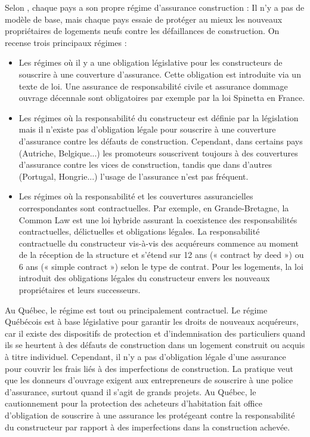 \documentclass[11pt]{article}
\begin{document}
Selon \cite{regime}, chaque pays a son propre régime d'assurance construction : Il n'y a pas de modèle de base, mais chaque pays essaie de protéger au mieux les nouveaux propriétaires de logements neufs contre les défaillances de construction. On recense trois principaux régimes :
\begin{itemize}
\item Les régimes où il y a une obligation législative pour les constructeurs de souscrire à une couverture d'assurance. Cette obligation est introduite via un texte de loi. Une assurance de responsabilité civile et assurance dommage ouvrage décennale sont obligatoires par exemple par la loi Spinetta en France.
\item Les régimes où la responsabilité du constructeur est définie par la législation mais il n'existe pas d'obligation légale pour souscrire à une couverture d'assurance contre les défauts de construction. Cependant, dans certains pays (Autriche, Belgique...) les promoteurs souscrivent toujours à des couvertures d'assurance contre les vices de construction, tandis que dans d'autres (Portugal, Hongrie...) l'usage de l'assurance n'est pas fréquent.
\item Les régimes où la responsabilité et les couvertures assurancielles correspondantes sont contractuelles. Par exemple, en Grande-Bretagne, la Common Law est une loi hybride assurant la coexistence des responsabilités contractuelles, délictuelles et obligations légales. La responsabilité contractuelle du constructeur vis-à-vis des acquéreurs commence au moment de la réception de la structure et s'étend sur 12 ans (« contract by deed ») ou 6 ans (« simple contract ») selon le type de contrat. Pour les logements, la loi introduit des obligations légales du constructeur envers les nouveaux propriétaires et leurs successeurs.
\end{itemize}

Au Québec, le régime est tout ou principalement contractuel. Le régime Québécois est à base législative pour garantir les droits de nouveaux acquéreurs, car il existe des dispositifs de protection et d'indemnisation des particuliers quand ils se heurtent à des défauts de construction dans un logement construit ou acquis à titre individuel. Cependant, il n'y a pas d'obligation légale d'une assurance pour couvrir les frais liés à des imperfections de construction. La pratique veut que les donneurs d'ouvrage exigent aux entrepreneurs de souscrire à une police d'assurance, surtout quand il s'agit de grands projets.
Au Québec, le cautionnement pour la protection des acheteurs d'habitation fait office d'obligation de souscrire à une assurance les protégeant contre la responsabilité du constructeur par rapport à des imperfections dans la construction achevée. 
\end{document}
